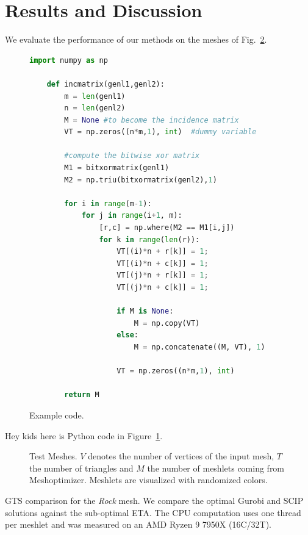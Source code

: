 \section{Results and Discussion}\label{Sec:Evaluation}

We evaluate the performance of our methods on the meshes of Fig.~\ref{fig:meshes}.
\begin{figure}

\begin{lstlisting}[language=Python, ]
    import numpy as np
            
    def incmatrix(genl1,genl2):
        m = len(genl1)
        n = len(genl2)
        M = None #to become the incidence matrix
        VT = np.zeros((n*m,1), int)  #dummy variable
            
        #compute the bitwise xor matrix
        M1 = bitxormatrix(genl1)
        M2 = np.triu(bitxormatrix(genl2),1) 
        
        for i in range(m-1):
            for j in range(i+1, m):
                [r,c] = np.where(M2 == M1[i,j])
                for k in range(len(r)):
                    VT[(i)*n + r[k]] = 1;
                    VT[(i)*n + c[k]] = 1;
                    VT[(j)*n + r[k]] = 1;
                    VT[(j)*n + c[k]] = 1;
                        
                    if M is None:
                        M = np.copy(VT)
                    else:
                        M = np.concatenate((M, VT), 1)
                    
                    VT = np.zeros((n*m,1), int)
            
        return M
\end{lstlisting}
\caption{Example code.}\label{Code:Python}
\end{figure}
    
Hey kids here is Python code in Figure~\ref{Code:Python}.

\begin{figure}
    \centering%
    \def\svgwidth{\textwidth}%
    \fontsize{6pt}{5pt}\selectfont%
    \caption{Test Meshes.
    $V$ denotes the number of vertices of the input mesh, $T$ the number of triangles and $M$ the number of meshlets coming from Meshoptimizer.
    Meshlets are visualized with randomized colors.
    }\label{fig:meshes}%
\end{figure}%

\begin{table}
    \caption{\acs{GTS} comparison for the \textit{Rock} mesh.
    We compare the optimal Gurobi and SCIP solutions against the sub-optimal \acs{ETA}.
    The CPU computation uses one thread per meshlet and was measured on an AMD Ryzen 9 7950X (16C/32T).    
    }\label{tab:StripifyTable}    
    {
    \centering    
    
    }
\end{table}


